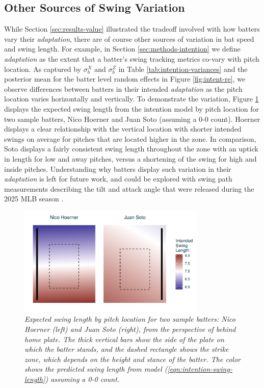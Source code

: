 \documentclass{article}
\begin{document}
    \subsection{Other Sources of Swing Variation}
    \label{sec:results-other}

    While Section \ref{sec:results-value} illustrated the tradeoff involved with how batters vary their \textit{adaptation}, there are of course other sources of variation in bat speed and swing length. For example, in Section \ref{sec:methods-intention} we define \textit{adaptation} as the extent that a batter's swing tracking metrics co-vary with pitch location. As captured by $\sigma_b^X$ and $\sigma_b^Z$ in Table \ref{tab:intention-variances} and the posterior mean for the batter level random effects in Figure \ref{fig:intent-re}, we observe differences between batters in their intended \textit{adaptation} as the pitch location varies horizontally and vertically. To demonstrate the variation, Figure \ref{fig:adaptation} displays the expected swing length from the intention model by pitch location for two sample batters, Nico Hoerner and Juan Soto (assuming a 0-0 count). Hoerner displays a clear relationship with the vertical location with shorter intended swings on average for pitches that are located higher in the zone. In comparison, Soto displays a fairly consistent swing length throughout the zone with an uptick in length for low and away pitches, versus a shortening of the swing for high and inside pitches. Understanding why batters display such variation in their \textit{adaptation} is left for future work, and could be explored with swing path measurements describing the tilt and attack angle that were released during the 2025 MLB season \citep{petriello_4_2025}.    
    
      \begin{figure}[H]
        \centering
        \includegraphics[width = 0.8\textwidth]{../../figures/adaptation.pdf}
        \caption{\it Expected swing length by pitch location for two sample batters: Nico Hoerner (left) and Juan Soto (right), from the perspective of behind home plate. The thick vertical bars show the side of the plate on which the batter stands, and the dashed rectangle shows the strike zone, which depends on the height and stance of the batter. The color shows the predicted swing length  from model (\ref{eqn:intention-swing-length}) assuming a 0-0 count.}
        \label{fig:adaptation}
      \end{figure}
\end{document}
